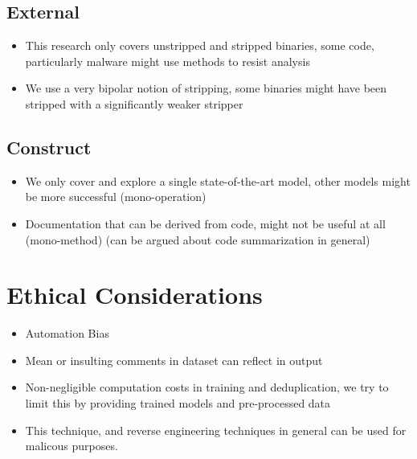 \subsection{External} 
\begin{itemize}
    \item This research only covers unstripped and stripped binaries, some code, particularly malware might use methods to resist analysis
    \item We use a very bipolar notion of stripping, some binaries might have been stripped with a significantly weaker stripper
    
\end{itemize}
\subsection{Construct}
\begin{itemize}
    \item We only cover and explore a single state-of-the-art model, other models might be more successful (mono-operation)
    \item Documentation that can be derived from code, might not be useful at all (mono-method) (can be argued about code summarization in general)
\end{itemize}
\section{Ethical Considerations}
\begin{itemize}
    \item Automation Bias
    \item Mean or insulting comments in dataset can reflect in output
    \item Non-negligible computation costs in training and deduplication, we try to limit this by providing trained models and pre-processed data
    \item This technique, and reverse engineering techniques in general can be used for malicous purposes. 
\end{itemize}